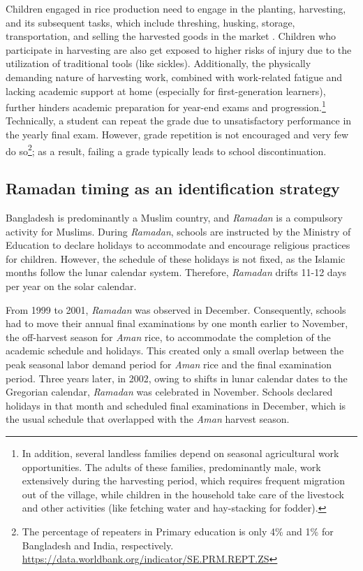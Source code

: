 \documentclass[12pt,letterpaper]{article}
\newcommand{\0}{\ensuremath{\mbox{\boldmath $0$}}}
\begin{document}
Children engaged in rice production need to engage in the planting, harvesting, and its subsequent tasks, which include threshing, husking, storage, transportation, and selling the harvested goods in the market \citep{chowdhury2009participatory}. Children who participate in harvesting are also get exposed to higher risks of injury due to the utilization of traditional tools (like sickles). Additionally, the physically demanding nature of harvesting work, combined with work-related fatigue and lacking academic support at home (especially for first-generation learners), further hinders academic preparation for year-end exams and progression.\footnote{In addition, several landless families depend on seasonal agricultural work opportunities. The adults of these families, predominantly male, work extensively during the harvesting period, which requires frequent migration out of the village, while children in the household take care of the livestock and other activities (like fetching water and hay-stacking for fodder). } Technically, a student can repeat the grade due to unsatisfactory performance in the yearly final exam. However, grade repetition is not encouraged and very few do so\footnote{The percentage of repeaters in Primary education is only 4\% and 1\% for Bangladesh and India, respectively. \url{https://data.worldbank.org/indicator/SE.PRM.REPT.ZS} }; as a result, failing a grade typically leads to school discontinuation.


\subsection{Ramadan timing as an identification strategy}

Bangladesh is predominantly a Muslim country, and \textit{Ramadan} is a compulsory activity for Muslims. During \textit{Ramadan}, schools are instructed by the Ministry of Education to declare holidays to accommodate and encourage religious practices for children. However, the schedule of these holidays is not fixed, as the Islamic months follow the lunar calendar system. Therefore, \textit{Ramadan} drifts 11-12 days per year on the solar calendar.

From 1999 to 2001, \textit{Ramadan} was observed in December. Consequently, schools had to move their annual final examinations by one month earlier to November, the off-harvest season for \textit{Aman} rice, to accommodate the completion of the academic schedule and holidays. This created only a small overlap between the peak seasonal labor demand period for \textit{Aman} rice and the final examination period. Three years later, in 2002, owing to shifts in lunar calendar dates to the Gregorian calendar, \textit{Ramadan} was celebrated in November. Schools declared holidays in that month and scheduled final examinations in December, which is the usual schedule that overlapped with the \textit{Aman} harvest season. 
\end{document}
